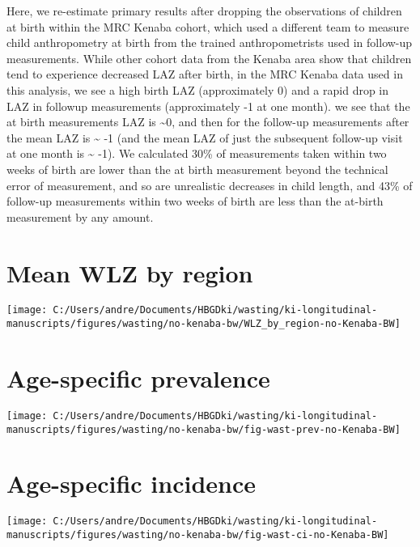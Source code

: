 \documentclass[
  9pt,
]{book}
\begin{document}
Here, we re-estimate primary results after dropping the observations of children at birth within the MRC Kenaba cohort, which used a different team to measure child anthropometry at birth from the trained anthropometrists used in follow-up measurements. While other cohort data from the Kenaba area show that children tend to experience decreased LAZ after birth, in the MRC Kenaba data used in this analysis, we see a high birth LAZ (approximately 0) and a rapid drop in LAZ in followup measurements (approximately -1 at one month).
we see that the at birth measurements LAZ is \textasciitilde0, and then for the follow-up measurements after the mean LAZ is \textasciitilde{} -1 (and the mean LAZ of just the subsequent follow-up visit at one month is \textasciitilde{} -1). We calculated 30\% of measurements taken within two weeks of birth are lower than the at birth measurement beyond the technical error of measurement, and so are unrealistic decreases in child length, and 43\% of follow-up measurements within two weeks of birth are less than the at-birth measurement by any amount.

\hypertarget{mean-wlz-by-region}{%
\section{Mean WLZ by region}\label{mean-wlz-by-region}}

\texttt{[image: C:/Users/andre/Documents/HBGDki/wasting/ki-longitudinal-manuscripts/figures/wasting/no-kenaba-bw/WLZ\_by\_region-no-Kenaba-BW]}

\hypertarget{age-specific-prevalence-2}{%
\section{Age-specific prevalence}\label{age-specific-prevalence-2}}

\texttt{[image: C:/Users/andre/Documents/HBGDki/wasting/ki-longitudinal-manuscripts/figures/wasting/no-kenaba-bw/fig-wast-prev-no-Kenaba-BW]}

\hypertarget{age-specific-incidence-1}{%
\section{Age-specific incidence}\label{age-specific-incidence-1}}

\texttt{[image: C:/Users/andre/Documents/HBGDki/wasting/ki-longitudinal-manuscripts/figures/wasting/no-kenaba-bw/fig-wast-ci-no-Kenaba-BW]}
\end{document}
